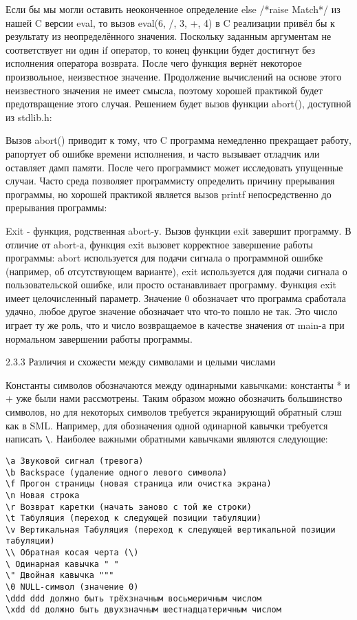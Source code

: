 Если бы мы могли оставить неоконченное определение else /*raise Match*/ из нашей C версии eval, то вызов eval(6, /, 3, +, 4) в C реализации привёл бы к результату из неопределённого значения. Поскольку заданным аргументам не соответствует ни один if оператор, то конец функции будет достигнут без исполнения оператора возврата. После чего функция вернёт некоторое произвольное, неизвестное значение. Продолжение вычислений на основе этого неизвестного значения не имеет смысла, поэтому хорошей практикой будет предотвращение этого случая. Решением будет вызов функции abort(), доступной из stdlib.h:

Вызов abort() приводит к тому, что C программа немедленно прекращает работу, рапортует об ошибке времени исполнения, и часто вызывает отладчик или оставляет дамп памяти. После чего программист может исследовать упущенные случаи. Часто среда позволяет программисту определить причину прерывания программы, но хорошей практикой является вызов printf непосредственно до прерывания программы:

Exit - функция, родственная abort-у. Вызов функции exit завершит программу. В отличие от abort-а, функция exit вызовет корректное завершение работы программы: abort используется для подачи сигнала о программной ошибке (например, об отсутствующем варианте), exit используется для подачи сигнала о пользовательской ошибке, или просто останавливает программу. Функция exit имеет целочисленный параметр. Значение 0 обозначает что программа сработала удачно, любое другое значение обозначает что что-то пошло не так. Это число играет ту же роль, что и число возвращаемое в качестве значения от main-а при нормальном завершении работы программы.

2.3.3 Различия и схожести между символами и целыми числами

Константы символов обозначаются между одинарными кавычками: константы * и + уже были нами рассмотрены. Таким образом можно обозначить большинство символов, но для некоторых символов требуется экранирующий обратный слэш как в SML. Например, для обозначения одной одинарной кавычки требуется написать \lstinline|\|. Наиболее важными обратными кавычками являются следующие:

\begin{lstlisting}
\a Звуковой сигнал (тревога)
\b Backspace (удаление одного левого символа)
\f Прогон страницы (новая страница или очистка экрана)
\n Новая строка
\r Возврат каретки (начать заново с той же строки)
\t Табуляция (переход к следующей позиции табуляции)
\v Вертикальная Табуляция (переход к следующей вертикальной позиции табуляции)
\\ Обратная косая черта (\)
\ Одинарная кавычка " "
\" Двойная кавычка """
\0 NULL-символ (значение 0)
\ddd ddd должно быть трёхзначным восьмеричным числом
\xdd dd должно быть двухзначным шестнадцатеричным числом
\end{lstlisting}

